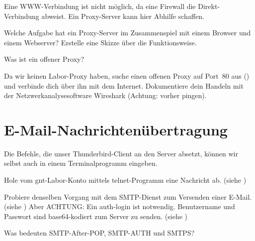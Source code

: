 \begin{aufgabe}
Eine WWW-Verbindung ist nicht möglich, da eine Firewall die Direkt-Verbindung abweist. Ein Proxy-Server kann hier Abhilfe schaffen.

Welche Aufgabe hat ein Proxy-Server im Zusammenspiel mit einem Browser und einem Webserver? Erstelle eine Skizze über die Funktionsweise.
\end{aufgabe}


\begin{aufgabe}
Was ist ein offener Proxy?
\end{aufgabe}


\begin{aufgabe}
Da wir keinen Labor-Proxy haben, suche einen offenen Proxy auf Port~80 aus (\angabeurlproxies) und verbinde dich über ihn mit dem Internet. Dokumentiere dein Handeln mit der Netzwerkanalysesoftware Wireshark (Achtung: vorher pingen).
\end{aufgabe}


\section{E-Mail-Nachrichtenübertragung}

\begin{aufgabe}
Die Befehle, die unser Thunderbird-Client an den Server absetzt, können wir selbst auch in einem Terminalprogramm eingeben.

Hole vom gnt-Labor-Konto mittels telnet-Programm eine Nachricht ab. (siehe \angabeurlpop)
\end{aufgabe}


\begin{aufgabe}
Probiere denselben Vorgang mit dem SMTP-Dienst zum Versenden einer E-Mail. (siehe \angabeurlsmtp) Aber ACHTUNG: Ein auth-login ist notwendig. Benutzername und Passwort sind base64-kodiert zum Server zu senden. (siehe \angabeurltechnet)
\end{aufgabe}


\begin{aufgabe}
Was bedeuten SMTP-After-POP, SMTP-AUTH und SMTPS?
\end{aufgabe}

